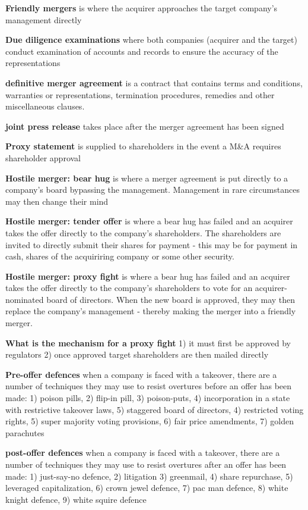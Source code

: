 \documentclass[12pt]{article}
\begin{document}
			\textbf{Friendly mergers}
			is where the acquirer approaches the target company's management directly
			
			\textbf{Due diligence examinations}
			where both companies (acquirer and the target) conduct examination of accounts and records to ensure the accuracy of the representations
			
			\textbf{definitive merger agreement}
			is a contract that contains terms and conditions, warranties or representations, termination procedures, remedies and other miscellaneous clauses.
			
			\textbf{joint press release}
			takes place after the merger agreement has been signed
		
			\textbf{Proxy statement}
			is supplied to shareholders in the event a M\&A requires shareholder approval
			
			\textbf{Hostile merger: bear hug}
			is where a merger agreement is put directly to a company's board bypassing the management. Management in rare circumstances may then change their mind
			
			\textbf{Hostile merger: tender offer}
			is where a bear hug has failed and an acquirer takes the offer directly to the company's shareholders. The shareholders are invited to directly submit their shares for payment - this may be for payment in cash, shares of the acquiriring company or some other security.
			
			\textbf{Hostile merger: proxy fight}	
			is where a bear hug has failed and an acquirer takes the offer directly to the company's shareholders to vote for an acquirer-nominated board of directors. When the new board is approved, they may then replace the company's management - thereby making the merger into a friendly merger. 
		
			\textbf{What is the mechanism for a proxy fight}
			1) it must first be approved by regulators
			2) once approved target shareholders are then mailed directly 

			\textbf{Pre-offer defences} when a company is faced with a takeover, there are a number of techniques they may use to resist overtures before an offer has been made: 1) poison pills, 2) flip-in pill, 3) poison-puts, 4) incorporation in a state with restrictive takeover laws, 5) staggered board of directors, 4) restricted voting rights, 5) super majority voting provisions, 6) fair price amendments, 7) golden parachutes
			
			\textbf{post-offer defences} when a company is faced with a takeover, there are a number of techniques they may use to resist overtures after an offer has been made: 1) just-say-no defence, 2) litigation 3) greenmail, 4) share repurchase, 5) leveraged capitalization, 6) crown jewel defence, 7) pac man defence, 8) white knight defence, 9) white squire defence
			
\end{document}
